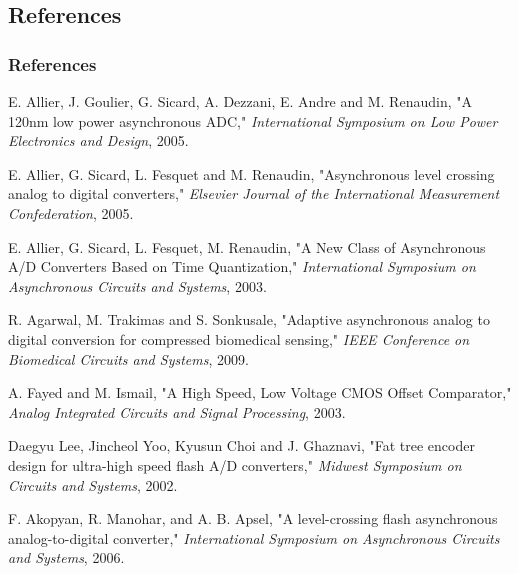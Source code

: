 \documentclass{beamer}
\begin{document}
\subsection*{References}
\begin{frame}
	\frametitle{References}
\begin{thebibliography}{12}
\tiny {
E. Allier, J. Goulier, G. Sicard, A. Dezzani, E. Andre and M. Renaudin, "A 120nm low power asynchronous ADC,"
 \emph {International Symposium on Low Power Electronics and Design}, 2005.

E. Allier, G. Sicard, L. Fesquet and M. Renaudin, "Asynchronous level crossing analog to digital converters," 
\emph {Elsevier Journal of the International Measurement Confederation}, 2005.

E. Allier, G. Sicard, L. Fesquet, M. Renaudin,  "A New Class of Asynchronous A/D Converters Based on Time Quantization," 
\emph {International Symposium on Asynchronous Circuits and Systems}, 2003.

R. Agarwal, M. Trakimas and S. Sonkusale, "Adaptive asynchronous analog to digital conversion for compressed biomedical sensing,"
\emph {IEEE Conference on Biomedical Circuits and Systems}, 2009.

A. Fayed and M. Ismail, "A High Speed, Low Voltage CMOS Offset Comparator," 
\emph {Analog Integrated Circuits and Signal Processing}, 2003.

Daegyu Lee, Jincheol Yoo, Kyusun Choi and J. Ghaznavi, "Fat tree encoder design for ultra-high speed flash A/D converters,"
\emph { Midwest Symposium on Circuits and Systems}, 2002.

F. Akopyan, R. Manohar, and A. B. Apsel, "A level-crossing flash asynchronous analog-to-digital converter," 
\emph {International Symposium on Asynchronous Circuits and Systems}, 2006. }


\end{thebibliography}
\end{frame}
\end{document}
